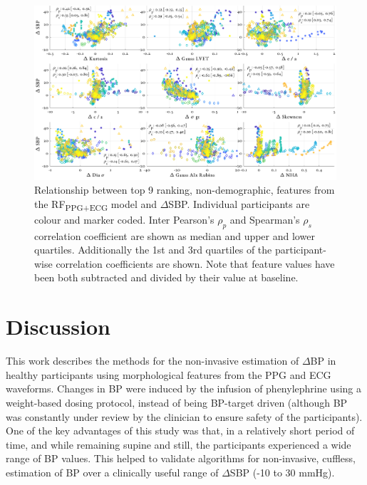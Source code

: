 \documentclass[fleqn,10pt]{wlscirep}
\begin{document}
\begin{figure}[ht]
	\centering
	\includegraphics[width = \textwidth]{scatter_best_features.png}
	\caption{Relationship between top 9 ranking, non-demographic, features from the RF\textsubscript{PPG+ECG} model and $\Delta$SBP. Individual participants are colour and marker coded. Inter Pearson's $\rho_p$ and Spearman's $\rho_s$ correlation coefficient are shown as median and upper and lower quartiles. Additionally the 1st and 3rd quartiles of the participant-wise correlation coefficients are shown. Note that feature values have been both subtracted and divided by their value at baseline.}
	\label{fig:scatter_best_features}
\end{figure}

\section{Discussion}


This work describes the methods for the non-invasive estimation of $\Delta$BP in healthy participants using morphological features from the PPG and ECG waveforms. Changes in BP were induced by the infusion of phenylephrine using a weight-based dosing protocol, instead of being BP-target driven (although BP was constantly under review by the clinician to ensure safety of the participants). One of the key advantages of this study was that, in a relatively short period of time, and while remaining supine and still, the participants experienced a wide range of BP values. This helped to validate algorithms for non-invasive, cuffless, estimation of BP over a clinically useful range of $\Delta$SBP (-10 to 30 mmHg). 
\end{document}
